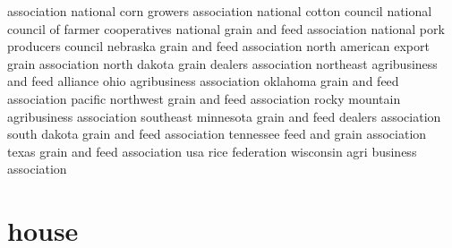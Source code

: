 \documentclass{article}
\begin{document}
association national corn growers association national cotton council national council of farmer cooperatives national grain and feed association national pork producers council nebraska grain and feed association north american export grain association north dakota grain dealers association northeast agribusiness and feed alliance ohio agribusiness association oklahoma grain and feed association pacific northwest grain and feed association rocky mountain agribusiness association southeast minnesota grain and feed dealers association south dakota grain and feed association tennessee feed and grain association texas grain and feed association usa rice federation wisconsin agri business association\pagebreak

\section*{house}
\end{document}
